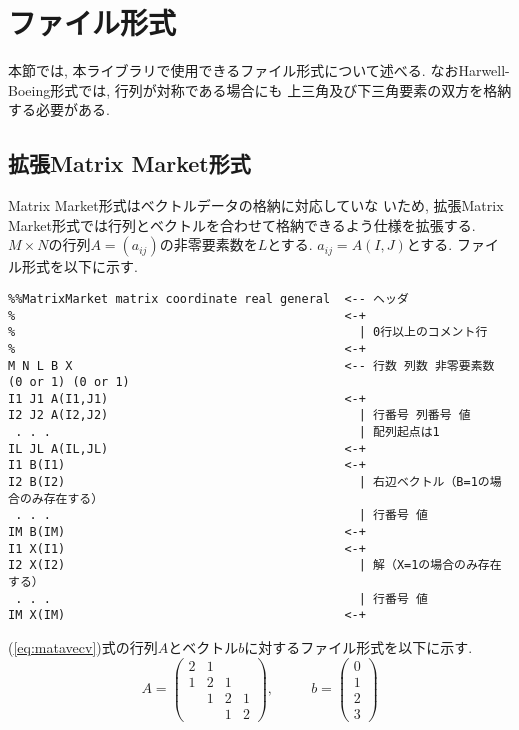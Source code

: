 \documentclass[a4paper]{jarticle}
\begin{document}
{{\section{ファイル形式}
\label{sec:matinp}
本節では, 本ライブラリで使用できるファイル形式について述べる.
なおHarwell-Boeing形式では, 行列が対称である場合にも
上三角及び下三角要素の双方を格納する必要がある. 

\subsection{拡張Matrix Market形式}
Matrix Market形式はベクトルデータの格納に対応していな
いため, 拡張Matrix Market形式では行列とベクトルを合わせて格納できるよう仕様を拡張する. 
$M \times N$の行列$A=(a_{ij})$の非零要素数を$L$とする. 
$a_{ij} = A(I,J)$とする. ファイル形式を以下に示す.

{\small
\begin{verbatim}
%%MatrixMarket matrix coordinate real general  <-- ヘッダ
%                                              <-+ 
%                                                | 0行以上のコメント行
%                                              <-+
M N L B X                                      <-- 行数 列数 非零要素数 (0 or 1) (0 or 1)
I1 J1 A(I1,J1)                                 <-+
I2 J2 A(I2,J2)                                   | 行番号 列番号 値
 . . .                                           | 配列起点は1
IL JL A(IL,JL)                                 <-+
I1 B(I1)                                       <-+
I2 B(I2)                                         | 右辺ベクトル（B=1の場合のみ存在する）
 . . .                                           | 行番号 値
IM B(IM)                                       <-+
I1 X(I1)                                       <-+
I2 X(I2)                                         | 解（X=1の場合のみ存在する）
 . . .                                           | 行番号 値
IM X(IM)                                       <-+
\end{verbatim}
}

(\ref{eq:matavecv})式の行列$A$とベクトル$b$に対するファイル形式を以下に示す. 
\begin{equation}
A = 
\left(
\begin{array}{cccc}
2 & 1 &   &    \\
1 & 2 & 1 &    \\ 
  & 1 & 2 & 1 \\
  &   & 1 & 2 
\end{array}
\right), 
~~~~~~~~~~~~
b = 
\left(
\begin{array}{c}
0 \\
1 \\ 
2 \\
3  
\end{array}
\right)
\label{eq:matavecv}
\end{equation}

}}
\end{document}
